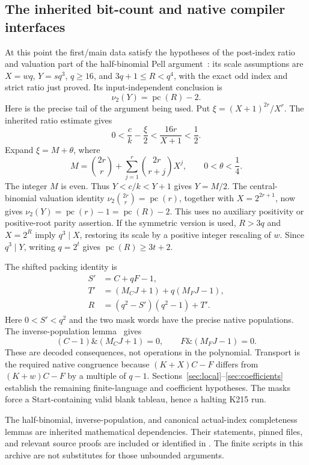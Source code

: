 \documentclass[11pt,a4paper]{article}
\theoremstyle{definition}\newtheorem{definition}[theorem]{Definition}
\theoremstyle{remark}\newtheorem{remark}[theorem]{Remark}
\newcommand{\pc}{\operatorname{pc}}
\newcommand{\vv}{\nu_2}
\newcommand{\code}[1]{\texttt{\detokenize{#1}}}
\begin{document}
\subsection{The inherited bit-count and native compiler interfaces}

At this point the first/main data satisfy the hypotheses of the
post-index ratio and valuation part of the half-binomial Pell
argument~\cite{halfbinomial,asymmetric}: its scale assumptions are
\(X=wq\), \(Y=sq^3\), \(q\ge16\), and
\(3q+1\le R<q^4\), with the exact odd index and strict ratio just
proved. Its input-independent conclusion is
\[
 \vv(Y)=\pc(R)-2.
\]
Here is the precise tail of the argument being used. Put
\(\xi=(X+1)^{2r}/X^r\). The inherited ratio estimate gives
\[
 0<\frac{c}{k}-\frac{\xi}{2}
   <\frac{16r}{X+1}<\frac12.
\]
Expand \(\xi=M+\theta\), where
\[
 M=\binom{2r}{r}+
       \sum_{j=1}^{r}\binom{2r}{r+j}X^j,
 \qquad 0<\theta<\frac14.
\]
The integer \(M\) is even. Thus \(Y<c/k<Y+1\) gives
\(Y=M/2\). The central-binomial valuation identity
\(\vv\binom{2r}{r}=\pc(r)\), together with \(X=2^{2r+1}\),
now gives \(\vv(Y)=\pc(r)-1=\pc(R)-2\).
This uses no auxiliary positivity or positive-root parity assertion.
If the symmetric version is used, \(R>3q\) and \(X=2^R\) imply
\(q^3\mid X\), restoring its scale by a positive integer rescaling
of \(w\). Since \(q^3\mid Y\), writing \(q=2^t\) gives
\(\pc(R)\ge3t+2\).

The shifted packing identity is
\begin{align*}
 S'&=C+qF-1,\\
 T'&=(M_CJ+1)+q(M_FJ-1),\\
 R&=(q^2-S')(q^2-1)+T'.
\end{align*}
Here \(0<S'<q^2\) and the two mask words have the precise native
populations. The inverse-population lemma~\cite{raw75,blank06} gives
\[
 (C-1)\mathbin{\&}(M_CJ+1)=0,
 \qquad F\mathbin{\&}(M_FJ-1)=0.
\]
These are decoded consequences, not operations in the polynomial.
Transport is the required native congruence because
\((K+X)C-F\) differs from \((K+w)C-F\) by a multiple of \(q-1\).
Sections~\ref{sec:local}--\ref{sec:coefficients} establish the
remaining finite-language and coefficient hypotheses. The masks force
a Start-containing valid blank tableau, hence a halting K215 run.

The half-binomial, inverse-population, and canonical actual-index
completeness lemmas are inherited mathematical dependencies. Their
statements, pinned files, and relevant source proofs are included or
identified in \code{provenance.json}. The finite scripts in this
archive are not substitutes for those unbounded arguments.
\end{document}
